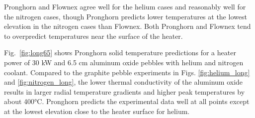 Pronghorn and Flownex agree well for the helium cases and reasonably well for the nitrogen cases, though Pronghorn predicts lower temperatures at the lowest elevation in the nitrogen cases than Flownex. Both Pronghorn and Flownex tend to overpredict temperatures near the surface of the heater.

Fig.\ \ref{fig:long65} shows Pronghorn solid temperature predictions for a heater power of 30 \si{\kilo\watt} and 6.5 \si{\centi\meter} aluminum oxide pebbles with helium and nitrogen coolant. Compared to the graphite pebble experiments in Figs. \ref{fig:helium_long} and \ref{fig:nitrogen_long}, the lower thermal conductivity of the aluminum oxide results in larger radial temperature gradients and higher peak temperatures by about 400\si{\celsius}. Pronghorn predicts the experimental data well at all points except at the lowest elevation close to the heater surface for helium.

